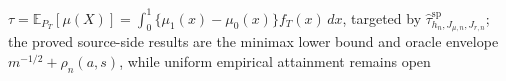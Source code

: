 \(\tau=\mathbb E_{P_T}[\mu(X)]=\int_0^1\{\mu_1(x)-\mu_0(x)\}f_T(x)\,dx\), targeted by \(\widehat\tau^{\mathrm{sp}}_{h_n,J_{\mu,n},J_{r,n}}\); the proved source-side results are the minimax lower bound and oracle envelope \(m^{-1/2}+\rho_n(a,s)\), while uniform empirical attainment remains open